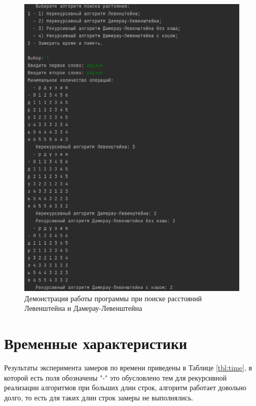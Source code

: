 \begin{figure}[h]
	\centering
	\includegraphics[height=0.7\textheight]{img/example.png}
	\caption{Демонстрация работы программы при поиске расстояний Левенштейна и Дамерау-Левенштейна}
	\label{img:demonstration}
\end{figure}

\clearpage

\section{Временные характеристики}

Результаты эксперимента замеров по времени приведены в Таблице \ref{tbl:time}, в которой есть поля обозначены "\--" это обусловлено тем для рекурсивной реализации алгоритмов при больших длин строк, алгоритм работает довольно долго, то есть для таких длин строк замеры не выполнялись.

